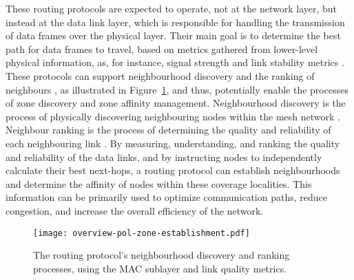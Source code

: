 These routing protocols are expected to operate, not at the network layer, but instead at the data link layer, which is responsible for handling the transmission of data frames over the physical layer. Their main goal is to determine the best path for data frames to travel, based on metrics gathered from lower-level physical information, as, for instance, signal strength and link stability metrics \cite{misra2009guide}. These protocols can support neighbourhood discovery and the ranking of neighbours \cite{batman-adv-v}, as illustrated in Figure~\ref{fig:proof-of-location-overview-pol-zone-establishment}, and thus, potentially enable the processes of zone discovery and zone affinity management. Neighbourhood discovery is the process of physically discovering neighbouring nodes within the mesh network \cite{open-mesh-ogmv2}. Neighbour ranking is the process of determining the quality and reliability of each neighbouring link \cite{seither2011routing}. By measuring, understanding, and ranking the quality and reliability of the data links, and by instructing nodes to independently calculate their best next-hops, a routing protocol can establish neighbourhoods and determine the affinity of nodes within these coverage localities. This information can be primarily used to optimize communication paths, reduce congestion, and increase the overall efficiency of the network.

\begin{figure}[h!]
    \begin{center}
    \texttt{[image: overview-pol-zone-establishment.pdf]}
    \caption{The routing protocol's neighbourhood discovery and ranking processes, using the MAC sublayer and link quality metrics.}
    \label{fig:proof-of-location-overview-pol-zone-establishment}
    \end{center}
\end{figure}

